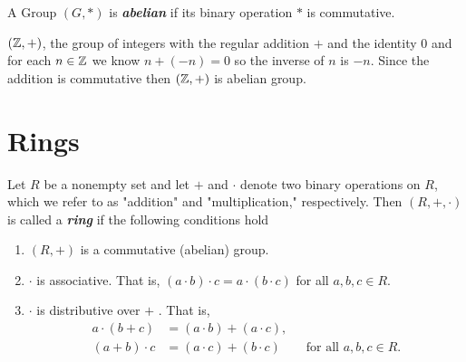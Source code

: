 \begin{mydef}
    A Group \((G,*)\) is \textit{\textbf{abelian}} if its binary operation \(*\) is commutative.
\end{mydef}

\begin{example}
    \((\mathbb{Z},+)\), the group of integers with the regular addition \(+\) and the identity \(0\) and for each \(n\in \mathbb{Z}\) we know \(n+(-n)=0\) so the inverse of \(n\) is \(-n\). Since the addition is commutative then \((\mathbb{Z},+)\) is abelian group.
\end{example}

\section{Rings}

\begin{mydef}
    Let \(R\) be a nonempty set and let \(+\) and \(\cdot\) denote two binary operations on \(R\), which we refer to as "addition" and "multiplication," respectively. Then \((R,+,\cdot)\) is called a \textbf{\textit{ring}} if the following conditions hold 
    \begin{enumerate}
    \item  \((R,+)\) is a commutative (abelian) group.
    
    \item  \(\cdot\) is associative. That is, \((a\cdot b)\cdot c=a\cdot (b\cdot c)\) for all \(a,b,c \in R\).
    
    \item  \(\cdot\) is distributive over \(+\)
    . That is,
    \begin{align*}
        a\cdot(b+c)&=(a\cdot b)+(a\cdot c),\\
        (a+b)\cdot c &=(a\cdot c)+(b\cdot c) \qquad \text{for all }a,b,c \in R.
    \end{align*}
    \end{enumerate}
\end{mydef}

